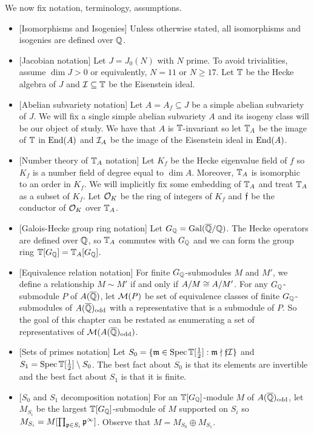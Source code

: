 \documentclass[11pt, proquest]{uwthesis}
\begin{document}
We now fix notation, terminology, assumptions.
\begin{itemize}
    \item{} [Isomorphisms and Isogenies]
        Unless otherwise stated, all isomorphisms and isogenies are defined
        over $\mathbb{Q}$.
    \item{} [Jacobian notation]
        Let $J = J_0(N)$ with $N$ prime. To avoid trivialities, assume $\dim
        J>0$ or equivalently, $N=11$ or $N\geq 17$. Let $\mathbb{T}$ be the Hecke
        algebra of $J$ and $\mathcal{I}\subseteq \mathbb{T}$ be the Eisenstein ideal.
    \item{} [Abelian subvariety notation]
        Let $A=A_f\subseteq J$ be a simple abelian subvariety of $J$. We will
        fix a single simple abelian subvariety $A$ and its isogeny class will
        be our object of study. We have that $A$ is $\mathbb{T}$-invariant so let
        $\mathbb{T}_A$ be the image of $\mathbb{T}$ in $\operatorname{End}(A)$ and $\mathcal{I}_A$ be the image of
        the Eisenstein ideal in $\operatorname{End}(A)$. 
    \item{} [Number theory of $\mathbb{T}_A$ notation] 
        Let $K_f$ be the Hecke eigenvalue field of $f$ so $K_f$ is a number
        field of degree equal to $\dim A$. Moreover, $\mathbb{T}_A$ is isomorphic to
        an order in $K_f$. We will implicitly fix some embedding of $\mathbb{T}_A$ and
        treat $\mathbb{T}_A$ as a subset of $K_f$. Let $\mathcal{O}_K$ be the ring of integers
        of $K_f$ and $\mathfrak{f}$ be the conductor of $\mathcal{O}_K$ over $\mathbb{T}_A$.
    \item{} [Galois-Hecke group ring notation]
        Let $G_{\mathbb{Q}}=\operatorname{Gal}(\overline{\mathbb{Q}}/\mathbb{Q})$. The Hecke operators are defined over
        $\mathbb{Q}$, so $\mathbb{T}_A$ commutes with $G_{\mathbb{Q}}$ and we can form the group ring
        $\mathbb{T}[G_{\mathbb{Q}}]=\mathbb{T}_A[G_{\mathbb{Q}}]$.
    \item{} [Equivalence relation notation]
        For finite $G_{\mathbb{Q}}$-submodules $M$ and $M'$, we define a relationship
        $M\sim M'$ if and only if $A/M \cong A/M'$. For any $G_{\mathbb{Q}}$-submodule
        $P$ of $A(\overline{\mathbb{Q}})$, let $\mathcal{M}(P)$ be set of equivalence classes of finite
        $G_{\mathbb{Q}}$-submodules of $A(\overline{\mathbb{Q}})_{\mathrm{odd}}$ with a representative that is a
        submodule of $P$. So the goal of this chapter can be restated as
        enumerating a set of representatives of $\mathcal{M}(A(\overline{\mathbb{Q}})_{\mathrm{odd}})$.
    \item{} [Sets of primes notation]
        Let $S_0=\{\mathfrak{m}\in \operatorname{Spec}\mathbb{T}[\frac 12]: \mathfrak{m} \nmid
        \mathfrak{f}\mathcal{I}\}$ and $S_1 = \operatorname{Spec}\mathbb{T}[\frac 12]\setminus S_0$.
        The best fact about $S_0$ is that its elements are invertible and the
        best fact about $S_1$ is that it is finite.
    \item{} [$S_0$ and $S_1$ decomposition notation]
        For an $\mathbb{T}[G_{\mathbb{Q}}]$-module $M$ of $A(\overline{\mathbb{Q}})_{\mathrm{odd}}$, let $M_{S_i}$ be the largest
        $\mathbb{T}[G_{\mathbb{Q}}]$-submodule of $M$ supported on $S_i$ so $M_{S_i}=M[\prod_{\mathfrak{p}\in S_i}
        \mathfrak{p}^\infty]$. Observe that $M = M_{S_0}\oplus M_{S_1}$.
\end{itemize}
\end{document}
